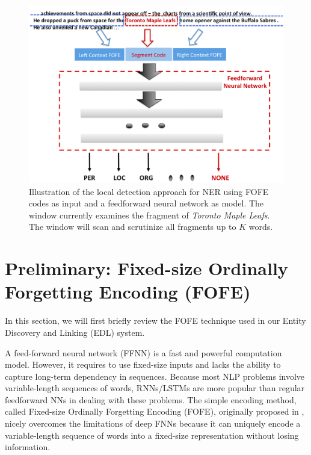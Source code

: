 \documentclass[11pt]{article}
\begin{document}
\begin{figure}[t]
\centering
\includegraphics[width=0.75\linewidth]{Figure-Diagram.png}
\caption{Illustration of the local detection approach for NER using FOFE codes as input and a feedforward neural network as model. The window currently examines the fragment of {\it Toronto Maple Leafs}. The window will scan and scrutinize all fragments up to $K$ words. }
\label{Fig:FOFE-NER-diagram}
\end{figure}

\section{Preliminary: Fixed-size Ordinally Forgetting Encoding (FOFE) }

In this section, we will first briefly review the FOFE technique used in our Entity Discovery and Linking (EDL) system.

A feed-forward neural network (FFNN) is a fast and powerful computation model. 
However, it requires to use fixed-size inputs and 
lacks the ability to capture long-term dependency in sequences. 
Because most NLP problems involve variable-length sequences of words, 
RNNs/LSTMs are more popular than regular feedforward NNs in dealing with these problems. 
The simple encoding method, called Fixed-size Ordinally Forgetting Encoding (FOFE), 
originally proposed in \cite{zhang2015fixed}, nicely overcomes the limitations of deep FNNs because it 
can uniquely encode a variable-length sequence of words into a fixed-size representation without losing information. 
\end{document}
